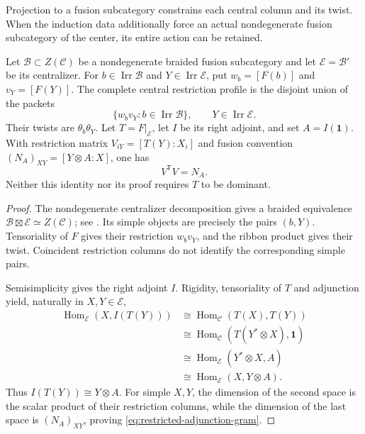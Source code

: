 Projection to a fusion subcategory constrains each central column and its
twist. When the induction data additionally force an actual nondegenerate
fusion subcategory of the center, its entire action can be retained.

\begin{proposition}
\label{prop:central-packets-adjunction}
Let $\mathcal B\subset Z(\mathcal C)$ be a nondegenerate braided fusion
subcategory and let $\mathcal E=\mathcal B'$ be its centralizer.
For $b\in\operatorname{Irr}\mathcal B$ and
$Y\in\operatorname{Irr}\mathcal E$, put
$w_b=[F(b)]$ and $v_Y=[F(Y)]$. The complete central restriction profile
is the disjoint union of the packets
\[
 \{w_bv_Y:b\in\operatorname{Irr}\mathcal B\},
 \qquad Y\in\operatorname{Irr}\mathcal E.
\]
Their twists are $\theta_b\theta_Y$.
Let $T=F|_{\mathcal E}$, let $I$ be its right adjoint, and set
$A=I(\mathbf1)$. With restriction matrix
$V_{iY}=[T(Y):X_i]$ and fusion convention
$(N_A)_{XY}=[Y\otimes A:X]$, one has
\begin{equation}\label{eq:restricted-adjunction-gram}
 V^{\mathsf T}V=N_A.
\end{equation}
Neither this identity nor its proof requires $T$ to be dominant.
\end{proposition}
\begin{proof}
The nondegenerate centralizer decomposition gives a braided equivalence
$\mathcal B\boxtimes\mathcal E\simeq Z(\mathcal C)$; see
\cite{EGNO}. Its simple objects are precisely the pairs $(b,Y)$.
Tensoriality of $F$ gives their restriction $w_bv_Y$, and the ribbon
product gives their twist. Coincident restriction columns do not identify
the corresponding simple pairs.

Semisimplicity gives the right adjoint $I$. Rigidity, tensoriality of
$T$ and adjunction yield, naturally in $X,Y\in\mathcal E$,
\[
 \begin{split}
 \operatorname{Hom}_{\mathcal E}(X,I(T(Y)))
 &\cong\operatorname{Hom}_{\mathcal C}(T(X),T(Y))\\
 &\cong\operatorname{Hom}_{\mathcal C}(T(Y^*\otimes X),\mathbf1)\\
 &\cong\operatorname{Hom}_{\mathcal E}(Y^*\otimes X,A)\\
 &\cong\operatorname{Hom}_{\mathcal E}(X,Y\otimes A).
 \end{split}
\]
Thus $I(T(Y))\cong Y\otimes A$. For simple $X,Y$, the dimension of
the second space is the scalar product of their restriction columns,
while the dimension of the last space is $(N_A)_{XY}$, proving
\eqref{eq:restricted-adjunction-gram}.
\end{proof}

